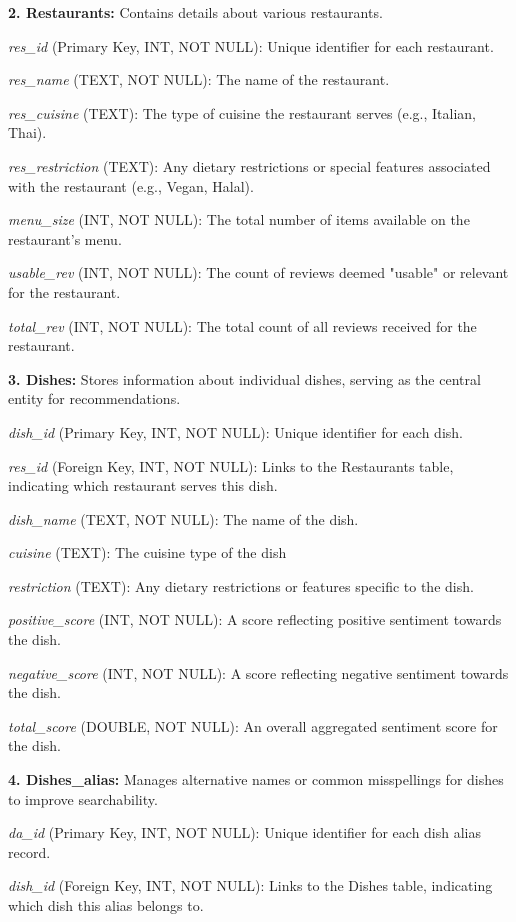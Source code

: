\textbf{2. Restaurants:} Contains details about various restaurants.

\textit{res\_id} (Primary Key, INT, NOT NULL): Unique identifier for each restaurant.

\textit{res\_name} (TEXT, NOT NULL): The name of the restaurant.

\textit{res\_cuisine} (TEXT): The type of cuisine the restaurant serves (e.g., Italian, Thai).

\textit{res\_restriction} (TEXT): Any dietary restrictions or special features associated with the restaurant (e.g., Vegan, Halal).

\textit{menu\_size} (INT, NOT NULL): The total number of items available on the restaurant's menu.

\textit{usable\_rev} (INT, NOT NULL): The count of reviews deemed "usable" or relevant for the restaurant.

\textit{total\_rev} (INT, NOT NULL): The total count of all reviews received for the restaurant.

\textbf{3. Dishes:} Stores information about individual dishes, serving as the central entity for recommendations.

\textit{dish\_id} (Primary Key, INT, NOT NULL): Unique identifier for each dish.

\textit{res\_id} (Foreign Key, INT, NOT NULL): Links to the Restaurants table, indicating which restaurant serves this dish.

\textit{dish\_name} (TEXT, NOT NULL): The name of the dish.

\textit{cuisine} (TEXT): The cuisine type of the dish

\textit{restriction} (TEXT): Any dietary restrictions or features specific to the dish.

\textit{positive\_score} (INT, NOT NULL): A score reflecting positive sentiment towards the dish.

\textit{negative\_score} (INT, NOT NULL): A score reflecting negative sentiment towards the dish.

\textit{total\_score} (DOUBLE, NOT NULL): An overall aggregated sentiment score for the dish.

\textbf{4. Dishes\_alias:} Manages alternative names or common misspellings for dishes to improve searchability.

\textit{da\_id} (Primary Key, INT, NOT NULL): Unique identifier for each dish alias record.

\textit{dish\_id} (Foreign Key, INT, NOT NULL): Links to the Dishes table, indicating which dish this alias belongs to.

